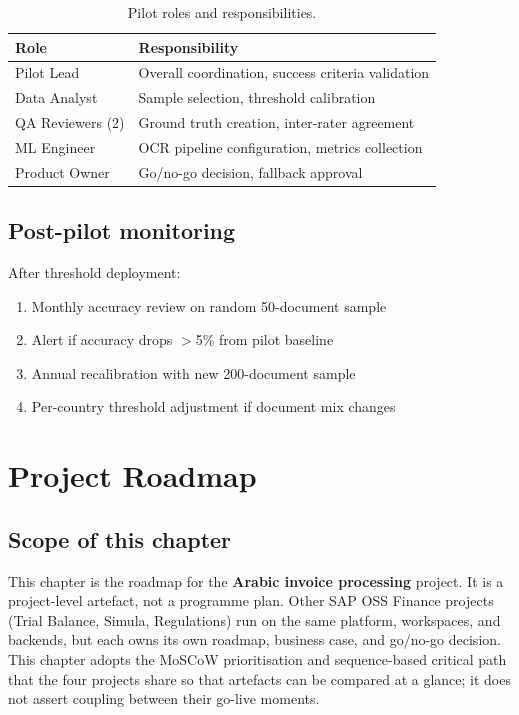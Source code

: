 \documentclass[11pt,a4paper,twoside]{report}
\begin{document}
\begin{table}[htbp]
\centering
\caption{Pilot roles and responsibilities.}
\label{tab:pilot-roles}
\footnotesize
\begin{tabularx}{\linewidth}{@{}l X@{}}
\toprule
\textbf{Role} & \textbf{Responsibility} \\ \midrule
Pilot Lead & Overall coordination, success criteria validation \\
Data Analyst & Sample selection, threshold calibration \\
QA Reviewers (2) & Ground truth creation, inter-rater agreement \\
ML Engineer & OCR pipeline configuration, metrics collection \\
Product Owner & Go/no-go decision, fallback approval \\
\bottomrule
\end{tabularx}
\end{table}

\section{Post-pilot monitoring}

After threshold deployment:
\begin{enumerate}
\item Monthly accuracy review on random 50-document sample
\item Alert if accuracy drops $>$5\% from pilot baseline
\item Annual recalibration with new 200-document sample
\item Per-country threshold adjustment if document mix changes
\end{enumerate}
\chapter{Project Roadmap}\label{ch:ap-roadmap}

\section*{Scope of this chapter}

This chapter is the roadmap for the \textbf{Arabic invoice processing}
project. It is a project-level artefact, not a programme plan. Other
SAP OSS Finance projects (Trial Balance, Simula, Regulations) run on
the same platform, workspaces, and backends, but each owns its own
roadmap, business case, and go/no-go decision. This chapter adopts the
MoSCoW prioritisation and sequence-based critical path that the four
projects share so that artefacts can be compared at a glance; it does
not assert coupling between their go-live moments.
\end{document}

